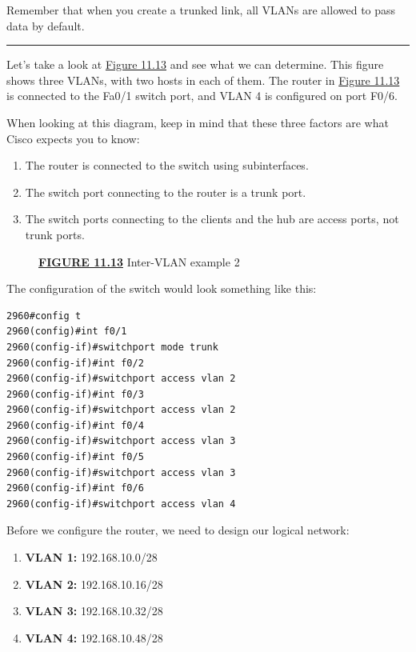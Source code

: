 Remember that when you create a trunked
link, all VLANs are allowed to pass data by default.

\begin{center}\rule{0.5\linewidth}{0.5pt}\end{center}

Let's take a look at
\protect\hyperlink{c11.xhtmlux5cux23figure11-13}{Figure 11.13} and see
what we can determine. This figure shows three VLANs, with two hosts in
each of them. The router in
\protect\hyperlink{c11.xhtmlux5cux23figure11-13}{Figure 11.13} is
connected to the Fa0/1 switch port, and VLAN 4 is configured on port
F0/6.

When looking at this diagram, keep in mind that these three factors are
what Cisco expects you to know:

\begin{enumerate}
\tightlist
\item
  The router is connected to the switch using subinterfaces.
\item
  The switch port connecting to the router is a trunk port.
\item
  The switch ports connecting to the clients and the hub are access
  ports, not trunk ports.
\end{enumerate}

\begin{figure}
\centering
\caption{{\protect\hyperlink{c11.xhtmlux5cux23figureanchor11-13}{\textbf{FIGURE
11.13}} Inter-VLAN example 2}}
\end{figure}

The configuration of the switch would look something like this:

\begin{verbatim}
2960#config t
2960(config)#int f0/1
2960(config-if)#switchport mode trunk
2960(config-if)#int f0/2
2960(config-if)#switchport access vlan 2
2960(config-if)#int f0/3
2960(config-if)#switchport access vlan 2
2960(config-if)#int f0/4
2960(config-if)#switchport access vlan 3
2960(config-if)#int f0/5
2960(config-if)#switchport access vlan 3
2960(config-if)#int f0/6
2960(config-if)#switchport access vlan 4
\end{verbatim}

Before we configure the router, we need to design our logical network:

\begin{enumerate}
\tightlist
\item
  \textbf{VLAN 1:} 192.168.10.0/28
\item
  \textbf{VLAN 2:} 192.168.10.16/28
\item
  \textbf{VLAN 3:} 192.168.10.32/28
\item
  \textbf{VLAN 4:} 192.168.10.48/28
\end{enumerate}

